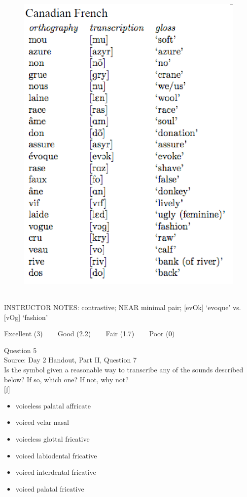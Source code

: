 \documentclass[12pt]{article}
\begin{document}
\begin{figure}[H]
\includegraphics{../images/canadianfrench.png}
\end{figure}

~\\
INSTRUCTOR NOTES: contrastive; NEAR minimal pair; [evOk] ‘evoque’ vs. [vOg] ‘fashion’


\vfill
Excellent (3) ~~~ Good (2.2) ~~~ Fair (1.7) ~~~ Poor (0)
\newpage

{\large Question 5}\\

Source: Day 2 Handout, Part II, Question 7\\

Is the symbol given a reasonable way to transcribe any of the sounds described below? If so, which one? If not, why not?\\

{[ʃ]}

\begin{itemize} \item voiceless palatal affricate \item voiced velar nasal \item voiceless glottal fricative \item voiced labiodental fricative \item voiced interdental fricative \item voiced palatal fricative \end{itemize}
\end{document}
